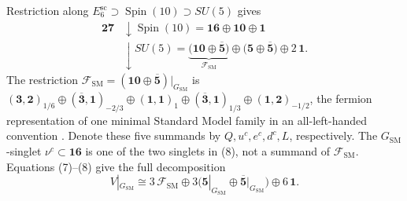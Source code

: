 \documentclass[11pt]{article}
\theoremstyle{remark}
\newcommand{\Ksm}{G_{\mathrm{SM}}}
\begin{document}
Restriction along
\(E_6^{\mathrm{sc}}\supset\operatorname{Spin}(10)\supset SU(5)\)
gives
\[
\begin{aligned}
\mathbf{27}
&\downarrow\operatorname{Spin}(10)
 =\mathbf{16}\oplus\mathbf{10}\oplus\mathbf1\\
&\downarrow SU(5)
 =\underbrace{\bigl(\mathbf{10}\oplus\overline{\mathbf5}\bigr)}
 _{\mathcal F_{\mathrm{SM}}}
 \oplus\bigl(\mathbf5\oplus\overline{\mathbf5}\bigr)
 \oplus2\,\mathbf1.
\end{aligned}
\tag{8}
\]
The restriction
\(\mathcal F_{\mathrm{SM}}
 =(\mathbf{10}\oplus\overline{\mathbf5})|_{\Ksm}\)
is
\((\mathbf3,\mathbf2)_{1/6}\oplus
(\overline{\mathbf3},\mathbf1)_{-2/3}\oplus
(\mathbf1,\mathbf1)_1\oplus
(\overline{\mathbf3},\mathbf1)_{1/3}\oplus
(\mathbf1,\mathbf2)_{-1/2}\), the fermion representation of one minimal
Standard Model family in an all-left-handed convention
\cite{Slansky,McKayPatera}. Denote these five summands by
\(Q,u^c,e^c,d^c,L\), respectively. The
\(G_{\mathrm{SM}}\)-singlet \(\nu^c\subset\mathbf{16}\) is one of the two
singlets in (8), not a summand of \(\mathcal F_{\mathrm{SM}}\). Equations
(7)--(8) give the full decomposition
\[
V|_{\Ksm}\cong
3\,\mathcal F_{\mathrm{SM}}
\oplus3\bigl(\mathbf5|_{\Ksm}\oplus
             \overline{\mathbf5}|_{\Ksm}\bigr)
\oplus6\,\mathbf1. \tag{9}
\]
\end{document}
